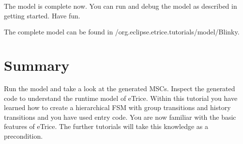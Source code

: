 The model is complete now. You can run and debug the model as described in getting started. Have fun.

The complete model can be found in /org.eclipse.etrice.tutorials/model/Blinky.

\section{Summary}

Run the model and take a look at the generated MSCs. Inspect the generated code to understand the runtime model of eTrice. Within this tutorial you have learned how to create a hierarchical FSM with group transitions and history transitions and you have used entry code. You are now familiar with the basic features of eTrice. The further tutorials will take this knowledge as a precondition.

